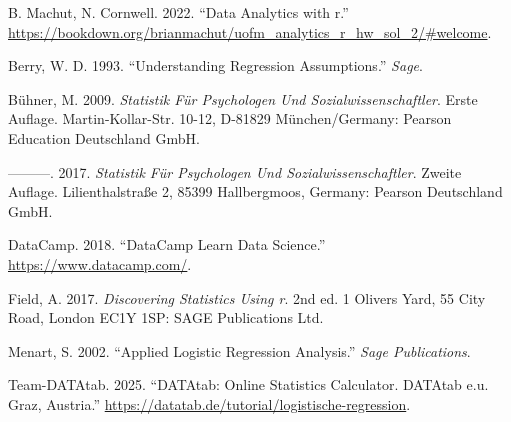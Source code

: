 \documentclass[
]{article}
\newlength{\cslhangindent}
\newenvironment{CSLReferences}[2] %
 {\begin{list}{}{%
  \setlength{\itemindent}{0pt}
  \setlength{\leftmargin}{0pt}
  \setlength{\parsep}{0pt}
  \ifodd #1
   \setlength{\leftmargin}{\cslhangindent}
   \setlength{\itemindent}{-1\cslhangindent}
  \fi
  \setlength{\itemsep}{#2\baselineskip}}}
 {\end{list}}
\begin{document}
\label{refs}
\begin{CSLReferences}{1}{0}
B. Machut, N. Cornwell. 2022. {``Data Analytics with r.''} \url{https://bookdown.org/brianmachut/uofm_analytics_r_hw_sol_2/\#welcome}.

Berry, W. D. 1993. {``Understanding Regression Assumptions.''} \emph{Sage}.

Bühner, M. 2009. \emph{Statistik Für Psychologen Und Sozialwissenschaftler}. Erste Auflage. Martin-Kollar-Str. 10-12, D-81829 München/Germany: Pearson Education Deutschland GmbH.

---------. 2017. \emph{Statistik Für Psychologen Und Sozialwissenschaftler}. Zweite Auflage. Lilienthalstraße 2, 85399 Hallbergmoos, Germany: Pearson Deutschland GmbH.

DataCamp. 2018. {``DataCamp Learn Data Science.''} \url{https://www.datacamp.com/}.

Field, A. 2017. \emph{Discovering Statistics Using r}. 2nd ed. 1 Olivers Yard, 55 City Road, London EC1Y 1SP: SAGE Publications Ltd.

Menart, S. 2002. {``Applied Logistic Regression Analysis.''} \emph{Sage Publications}.

Team-DATAtab. 2025. {``DATAtab: Online Statistics Calculator. DATAtab e.u. Graz, Austria.''} \url{https://datatab.de/tutorial/logistische-regression}.

\end{CSLReferences}
\end{document}
